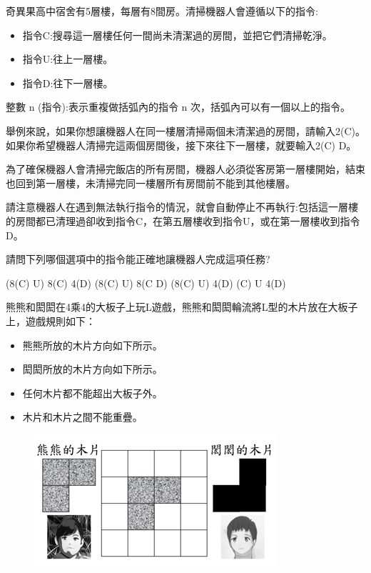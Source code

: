 \documentclass[a4paper, 12pt, addpoints]{exam}
\begin{document}
\vspace{0.1in}
\begin{questions}
    \question[4]
    奇異果高中宿舍有5層樓，每層有8間房。清掃機器人會遵循以下的指令:

    \begin{itemize}
        \item 指令C:搜尋這一層樓任何一間尚未清潔過的房間，並把它們清掃乾淨。
        \item 指令U:往上一層樓。
        \item 指令D:往下一層樓。
    \end{itemize}



    整數 n (指令):表示重複做括弧內的指令 n 次，括弧內可以有一個以上的指令。

    舉例來說，如果你想讓機器人在同一樓層清掃兩個未清潔過的房間，請輸入2(C)。如果你希望機器人清掃完這兩個房間後，接下來往下一層樓，就要輸入2(C) D。

    為了確保機器人會清掃完飯店的所有房間，機器人必須從客房第一層樓開始，結束也回到第一層樓，未清掃完同一樓層所有房間前不能到其他樓層。

    請注意機器人在遇到無法執行指令的情況，就會自動停止不再執行:包括這一層樓的房間都已清理過卻收到指令C，在第五層樓收到指令U，或在第一層樓收到指令D。

    請問下列哪個選項中的指令能正確地讓機器人完成這項任務?

    \begin{choices}
        (8(C) U) 8(C) 4(D)
        (8(C) U) 8(C D)
        (8(C) U) 4(D)
        (C) U 4(D)
    \end{choices}

    \question[4] 熊熊和閎閎在4乘4的大板子上玩L遊戲，熊熊和閎閎輪流將L型的木片放在大板子上，遊戲規則如下：

    \begin{itemize}
        \item 熊熊所放的木片方向如下所示。
        \item 閎閎所放的木片方向如下所示。
        \item 任何木片都不能超出大板子外。
        \item 木片和木片之間不能重疊。
    \end{itemize}

    \begin{figure}[H]
        \centerline{\includegraphics{fig/p2.png}}
    \end{figure}


\end{questions}
\end{document}
